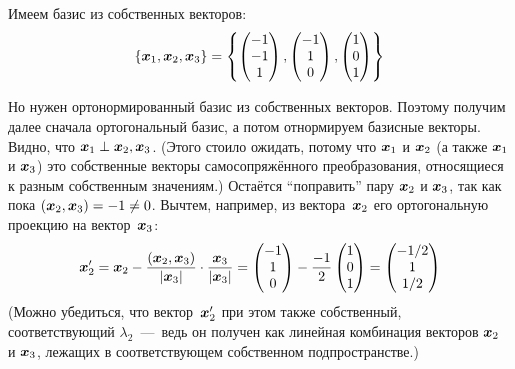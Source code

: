 \documentclass[a4paper,12pt]{article}
\theoremstyle{remark}
\begin{document}
\begin{solution}
    Имеем базис из собственных векторов:
    \[
      \{\boldsymbol x_1, \boldsymbol x_2, \boldsymbol x_3\} = \left\{
        \begin{pmatrix}
          -1 \\ -1 \\ 1
        \end{pmatrix},
        \begin{pmatrix}
          -1 \\ 1 \\ 0
        \end{pmatrix},
        \begin{pmatrix}
          1 \\ 0 \\ 1
        \end{pmatrix}
      \right\}
    \]
    
    Но нужен ортонормированный базис из собственных векторов.
    Поэтому получим далее сначала ортогональный базис, а потом отнормируем базисные векторы.
    Видно, что $\bds x_1 \hm\perp \bds x_2, \bds x_3$.
    (Этого стоило ожидать, потому что $\boldsymbol x_1$ и $\boldsymbol x_2$ (а также $\boldsymbol x_1$ и $\boldsymbol x_3$) это собственные векторы самосопряжённого преобразования, относящиеся к разным собственным значениям.)
    Остаётся ``поправить'' пару $\boldsymbol x_2$ и $\boldsymbol x_3$, так как пока $(\bds x_2, \bds x_3) \hm= -1 \hm{\not=} 0$.
    Вычтем, например, из вектора~$\boldsymbol x_2$ его ортогональную проекцию на вектор~$\boldsymbol x_3$:
    \[
      \boldsymbol x_2' = \boldsymbol x_2 - \frac{(\boldsymbol x_2, \boldsymbol x_3)}{|\boldsymbol x_3|} \cdot \frac{\boldsymbol x_3}{|\boldsymbol x_3|}
      = \begin{pmatrix}
        -1 \\ 1 \\ 0
      \end{pmatrix} - \frac{-1}{2} \begin{pmatrix}
        1 \\ 0 \\ 1
      \end{pmatrix}
      = \begin{pmatrix}
        -1/2 \\ 1 \\ 1/2
      \end{pmatrix}
    \]
    (Можно убедиться, что вектор~$\boldsymbol x_2'$ при этом также собственный, соответствующий $\lambda_2$~---~ведь он получен как линейная комбинация векторов $\boldsymbol x_2$ и $\boldsymbol x_3$, лежащих в соответствующем собственном подпространстве.)
    

\end{solution}
\end{document}

